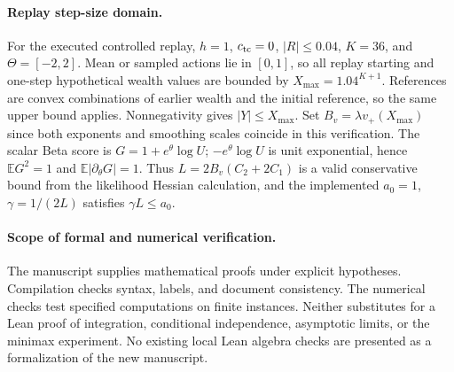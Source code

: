 \documentclass[11pt]{article}
\newcommand{\E}{\mathbb E}
\newcommand{\1}{\mathbf 1}
\theoremstyle{definition}
\begin{document}
\paragraph{Replay step-size domain.}
For the executed controlled replay, $h=1$, $c_{\rm tc}=0$, $|R|\le0.04$, $K=36$, and $\Theta=[-2,2]$. Mean or sampled actions lie in $[0,1]$, so all replay starting and one-step hypothetical wealth values are bounded by $X_{\max}=1.04^{K+1}$. References are convex combinations of earlier wealth and the initial reference, so the same upper bound applies. Nonnegativity gives $|Y|\le X_{\max}$. Set $B_v=\lambda v_+(X_{\max})$ since both exponents and smoothing scales coincide in this verification. The scalar Beta score is $G=1+e^\theta\log U$; $-e^\theta\log U$ is unit exponential, hence $\E G^2=1$ and $\E|\partial_\theta G|=1$. Thus $L=2B_v(C_2+2C_1)$ is a valid conservative bound from the likelihood Hessian calculation, and the implemented $a_0=1$, $\gamma=1/(2L)$ satisfies $\gamma L\le a_0$.

\paragraph{Scope of formal and numerical verification.}
The manuscript supplies mathematical proofs under explicit hypotheses. Compilation checks syntax, labels, and document consistency. The numerical checks test specified computations on finite instances. Neither substitutes for a Lean proof of integration, conditional independence, asymptotic limits, or the minimax experiment. No existing local Lean algebra checks are presented as a formalization of the new manuscript.
\end{document}
